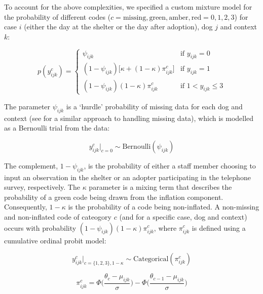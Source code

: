 \documentclass[12pt]{article}
\begin{document}
To account for the above complexities, we specified a custom mixture model for the probability of different codes ($c = {\text{missing}, \text{green}, \text{amber}, \text{red}} = {0, 1, 2, 3}$) for case $i$ (either the day at the shelter or the day after adoption), dog $j$ and context $k$:

\begin{equation}
  p(y_{ijk}^{c}) =
  \begin{cases}
      \psi_{ijk} & \text{if } y_{ijk} = 0 \\
      (1-\psi_{ijk})\big[\kappa + (1-\kappa)\pi_{ijk}^c\big]
      & \text{if } y_{ijk} = 1 \\
      (1-\psi_{ijk})(1-\kappa)\pi_{ijk}^c
      & \text{if } 1 < y_{ijk} \leq 3
  \end{cases}
  \label{eq_mixture}
\end{equation}

The parameter $\psi_{ijk}$ is a ‘hurdle’ probability of missing data for each dog and context (see \cite{kubinec2019} for a similar approach to handling missing data), which is modelled as a Bernoulli trial from the data:

\begin{equation}
  y_{ijk}^{c} \big|_{c=0} \sim \text{Bernoulli}(\psi_{ijk})
  \label{eq_missing}
\end{equation}

The complement, $1 - \psi_{ijk}$, is the probability of either a staff member choosing to input an observation in the shelter or an adopter participating in the telephone survey, respectively. The $\kappa$ parameter is a mixing term that describes the probability of a green code being drawn from the inflation component. Consequently,  $1 - \kappa$ is the probability of a code being non-inflated. A non-missing and non-inflated code of cateogory $c$ (and for a specific case, dog and context) occurs with probability $(1-\psi_{ijk})(1-\kappa)\pi_{ijk}^c$, where $\pi_{ijk}^c$ is defined using a cumulative ordinal probit model:

\begin{equation}
  y_{ijk}^{c} \big|_{c=\{1,2,3\}, 1 - \kappa} \sim \text{Categorical}(\pi_{ijk}^c)
  \label{eq_cat}
\end{equation}

\begin{equation}
  \pi_{ijk}^c = \Phi \Big( \frac{\theta_{c} - \mu_{ijk}}{\sigma} \Big) - \Phi \Big( \frac{\theta_{c-1} - \mu_{ijk}}{\sigma} \Big)
  \label{eq_ordprob}
\end{equation}
\end{document}

